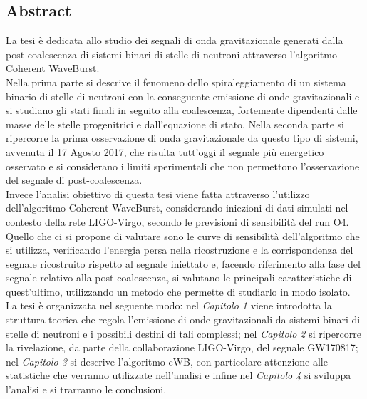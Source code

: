 \begin{changemargin}{2cm}{2cm}
	\chapter{Abstract}
		La tesi è dedicata allo studio dei segnali di onda gravitazionale generati dalla post-coalescenza di sistemi binari di stelle di neutroni attraverso l'algoritmo Coherent WaveBurst.\\
		Nella prima parte si descrive il fenomeno dello spiraleggiamento di un sistema binario di stelle di neutroni con la conseguente emissione di onde gravitazionali e si studiano gli stati finali in seguito alla coalescenza, fortemente dipendenti dalle masse delle stelle progenitrici e dall'equazione di stato. Nella seconda parte si ripercorre la prima osservazione di onda gravitazionale da questo tipo di sistemi, avvenuta il 17 Agosto 2017, che risulta tutt'oggi il segnale più energetico osservato e si considerano i limiti sperimentali che non permettono l'osservazione del segnale di post-coalescenza. \\
		Invece l'analisi obiettivo di questa tesi viene fatta attraverso l'utilizzo dell'algoritmo Coherent WaveBurst, considerando iniezioni di dati simulati nel contesto della rete LIGO-Virgo, secondo le previsioni di sensibilità del run O4. Quello che ci si propone di valutare sono le curve di sensibilità dell'algoritmo che si utilizza, verificando l'energia persa nella ricostruzione e la corrispondenza del segnale ricostruito rispetto al segnale iniettato e, facendo riferimento alla fase del segnale relativo alla post-coalescenza, si valutano le principali caratteristiche di quest'ultimo, utilizzando un metodo che permette di studiarlo in modo isolato. \\
		La tesi è organizzata nel seguente modo: nel \textit{Capitolo 1} viene introdotta la struttura teorica che regola l'emissione di onde gravitazionali da sistemi binari di stelle di neutroni e i possibili destini di tali complessi; nel \textit{Capitolo 2} si ripercorre la rivelazione, da parte della collaborazione LIGO-Virgo, del segnale GW170817; nel \textit{Capitolo 3} si descrive l'algoritmo cWB, con particolare attenzione alle statistiche che verranno utilizzate nell'analisi e infine nel \textit{Capitolo 4} si sviluppa l'analisi e si trarranno le conclusioni.
\end{changemargin}
\tableofcontents